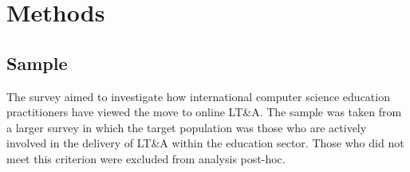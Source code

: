 \documentclass[conference]{IEEEtran}
\begin{document}



\section{Methods}\label{methods}

\subsection{Sample}


The survey aimed to investigate how international computer science education
practitioners have viewed the move to online LT\&A. The sample was
taken from a larger survey in which the target population was those
who are actively involved in the delivery of LT\&A within the
education sector. Those who did not meet this criterion were excluded
from analysis post-hoc.

\end{document}
